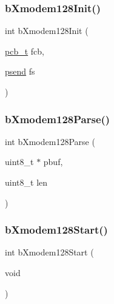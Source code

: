 \subsubsection{\texorpdfstring{b\+Xmodem128\+Init()}{bXmodem128Init()}}
{\footnotesize\ttfamily int b\+Xmodem128\+Init (\begin{DoxyParamCaption}\item[{\mbox{\hyperlink{group___x_m_o_d_e_m128___exported___types_definitions_ga1189ecafb71f5108788e9d2e7ac5e7f3}{pcb\+\_\+t}}}]{fcb,  }\item[{\mbox{\hyperlink{group___x_m_o_d_e_m128___exported___types_definitions_gad6ebbc53d3047463033cb2b686f40d66}{psend}}}]{fs }\end{DoxyParamCaption})}

\mbox{\label{group___x_m_o_d_e_m128___exported___functions_ga22d59aa816e006be041442488ea8539c}} 
\subsubsection{\texorpdfstring{b\+Xmodem128\+Parse()}{bXmodem128Parse()}}
{\footnotesize\ttfamily int b\+Xmodem128\+Parse (\begin{DoxyParamCaption}\item[{uint8\+\_\+t $\ast$}]{pbuf,  }\item[{uint8\+\_\+t}]{len }\end{DoxyParamCaption})}

\mbox{\label{group___x_m_o_d_e_m128___exported___functions_ga2999eae8ddb0eead2907b9e031e8f0cd}} 
\subsubsection{\texorpdfstring{b\+Xmodem128\+Start()}{bXmodem128Start()}}
{\footnotesize\ttfamily int b\+Xmodem128\+Start (\begin{DoxyParamCaption}\item[{void}]{ }\end{DoxyParamCaption})}

